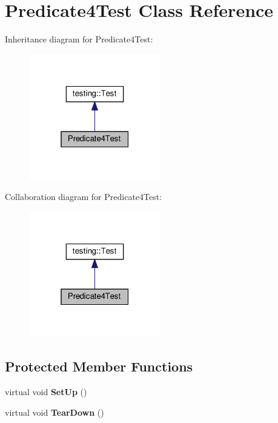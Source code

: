 \hypertarget{class_predicate4_test}{}\section{Predicate4\+Test Class Reference}
\label{class_predicate4_test}


Inheritance diagram for Predicate4\+Test\+:
\nopagebreak
\begin{figure}[H]
\begin{center}
\leavevmode
\includegraphics[width=163pt]{class_predicate4_test__inherit__graph}
\end{center}
\end{figure}


Collaboration diagram for Predicate4\+Test\+:
\nopagebreak
\begin{figure}[H]
\begin{center}
\leavevmode
\includegraphics[width=163pt]{class_predicate4_test__coll__graph}
\end{center}
\end{figure}
\subsection*{Protected Member Functions}
\begin{DoxyCompactItemize}
\item 
\mbox{\label{class_predicate4_test_afcf9db5dc68e97291813cdfeb2aaa5d2}} 
virtual void {\bfseries Set\+Up} ()
\item 
\mbox{\label{class_predicate4_test_ab61983a4cdf3657b02bc2b81b67729c4}} 
virtual void {\bfseries Tear\+Down} ()
\end{DoxyCompactItemize}

